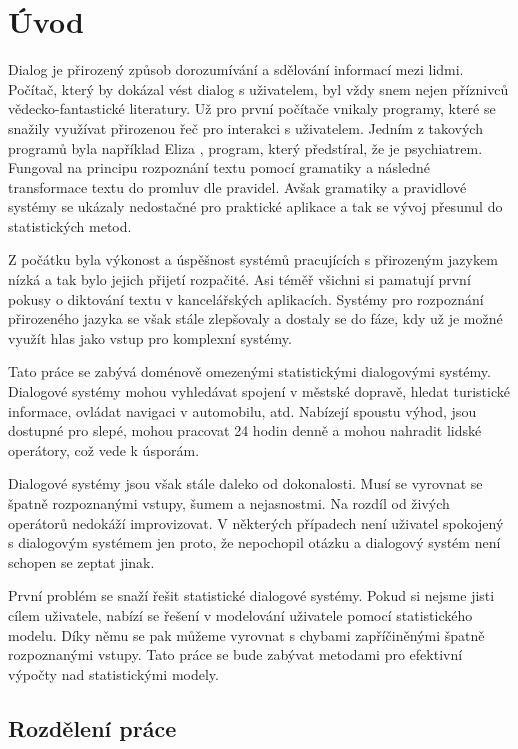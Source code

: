 \chapter*{Úvod}

Dialog je přirozený způsob dorozumívání a sdělování informací mezi lidmi.
Počítač, který by dokázal vést dialog s uživatelem, byl vždy snem nejen příznivců vědecko-fantastické literatury.
Už pro první počítače vnikaly programy, které se snažily využívat přirozenou řeč pro interakci s uživatelem.
Jedním z takových programů byla například Eliza \cite{weizenbaum1966eliza}, program, který předstíral, že je psychiatrem.
Fungoval na principu rozpoznání textu pomocí gramatiky a následné transformace textu do promluv dle pravidel.
Avšak gramatiky a pravidlové systémy se ukázaly nedostačné pro praktické aplikace a tak se vývoj přesunul do statistických metod.

Z počátku byla výkonost a úspěšnost systémů pracujících s přirozeným jazykem nízká a tak bylo jejich přijetí rozpačité.
Asi téměř všichni si pamatují první pokusy o diktování textu v kancelářských aplikacích.
Systémy pro rozpoznání přirozeného jazyka se však stále zlepšovaly a dostaly se do fáze, kdy už je možné využít hlas jako vstup pro komplexní systémy.

Tato práce se zabývá doménově omezenými statistickými dialogovými systémy.
Dialogové systémy mohou vyhledávat spojení v městské dopravě, hledat turistické informace, ovládat navigaci v automobilu, atd.
Nabízejí spoustu výhod, jsou dostupné pro slepé, mohou pracovat 24 hodin denně a mohou nahradit lidské operátory, což vede k úsporám.

Dialogové systémy jsou však stále daleko od dokonalosti.
Musí se vyrovnat se špatně rozpoznanými vstupy, šumem a nejasnostmi.
Na rozdíl od živých operátorů nedokáží improvizovat.
V některých případech není uživatel spokojený s dialogovým systémem jen proto, že nepochopil otázku a dialogový systém není schopen se zeptat jinak.

První problém se snaží řešit statistické dialogové systémy.
Pokud si nejsme jisti cílem uživatele, nabízí se řešení v modelování uživatele pomocí statistického modelu.
Díky němu se pak můžeme vyrovnat s chybami zapříčiněnými špatně rozpoznanými vstupy.
Tato práce se bude zabývat metodami pro efektivní výpočty nad statistickými modely.

\section*{Rozdělení práce}

